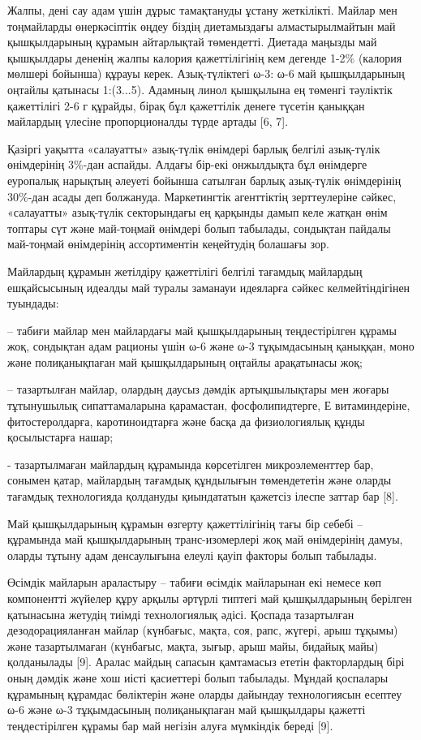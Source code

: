 Жалпы, дені сау адам үшін дұрыс тамақтануды ұстану жеткілікті. Майлар
мен тоңмайларды өнеркәсіптік өңдеу біздің диетамыздағы алмастырылмайтын
май қышқылдарының құрамын айтарлықтай төмендетті. Диетада маңызды май
қышқылдары дененің жалпы калория қажеттілігінің кем дегенде 1-2\%
(калория мөлшері бойынша) құрауы керек. Азық-түліктегі ω-3: ω-6 май
қышқылдарының оңтайлы қатынасы 1:(3...5). Адамның линол қышқылына ең
төменгі тәуліктік қажеттілігі 2-6 г құрайды, бірақ бұл қажеттілік денеге
түсетін қаныққан майлардың үлесіне пропорционалды түрде артады {[}6,
7{]}.

Қазіргі уақытта «салауатты» азық-түлік өнімдері барлық белгілі
азық-түлік өнімдерінің 3\%-дан аспайды. Алдағы бір-екі онжылдықта бұл
өнімдерге еуропалық нарықтың әлеуеті бойынша сатылған барлық азық-түлік
өнімдерінің 30\%-дан асады деп болжануда. Маркетингтік агенттіктің
зерттеулеріне сәйкес, «салауатты» азық-түлік секторындағы ең қарқынды
дамып келе жатқан өнім топтары сүт және май-тоңмай өнімдері болып
табылады, сондықтан пайдалы май-тоңмай өнімдерінің ассортиментін
кеңейтудің болашағы зор.

Майлардың құрамын жетілдіру қажеттілігі белгілі тағамдық майлардың
ешқайсысының идеалды май туралы заманауи идеяларға сәйкес
келмейтіндігінен туындады:

-- табиғи майлар мен майлардағы май қышқылдарының теңдестірілген құрамы
жоқ, сондықтан адам рационы үшін ω-6 және ω-3 тұқымдасының қаныққан,
моно және полиқанықпаған май қышқылдарының оңтайлы арақатынасы жоқ;

-- тазартылған майлар, олардың даусыз дәмдік артықшылықтары мен жоғары
тұтынушылық сипаттамаларына қарамастан, фосфолипидтерге, Е
витаминдеріне, фитостеролдарға, каротиноидтарға және басқа да
физиологиялық құнды қосылыстарға нашар;

- тазартылмаған майлардың құрамында көрсетілген микроэлементтер бар,
сонымен қатар, майлардың тағамдық құндылығын төмендететін және оларды
тағамдық технологияда қолдануды қиындататын қажетсіз ілеспе заттар бар
{[}8{]}.

Май қышқылдарының құрамын өзгерту қажеттілігінің тағы бір себебі --
құрамында май қышқылдарының транс-изомерлері жоқ май өнімдерінің дамуы,
оларды тұтыну адам денсаулығына елеулі қауіп факторы болып табылады.

Өсімдік майларын араластыру -- табиғи өсімдік майларынан екі немесе көп
компонентті жүйелер құру арқылы әртүрлі типтегі май қышқылдарының
берілген қатынасына жетудің тиімді технологиялық әдісі. Қоспада
тазартылған дезодорацияланған майлар (күнбағыс, мақта, соя, рапс,
жүгері, арыш тұқымы) және тазартылмаған (күнбағыс, мақта, зығыр, арыш
майы, бидайық майы) қолданылады {[}9{]}. Аралас майдың сапасын
қамтамасыз ететін факторлардың бірі оның дәмдік және хош иісті
қасиеттері болып табылады. Мұндай қоспалары құрамының құрамдас
бөліктерін және оларды дайындау технологиясын есептеу ω-6 және ω-3
тұқымдасының полиқанықпаған май қышқылдары қажетті теңдестірілген құрамы
бар май негізін алуға мүмкіндік береді {[}9{]}.

